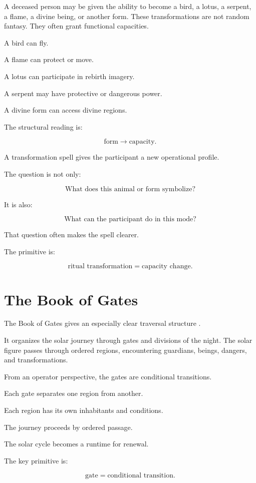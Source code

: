 \documentclass[11pt]{book}
\begin{document}
A deceased person may be given the ability to become a bird, a lotus, a serpent, a flame, a divine being, or another form. These transformations are not random fantasy. They often grant functional capacities.

A bird can fly.

A flame can protect or move.

A lotus can participate in rebirth imagery.

A serpent may have protective or dangerous power.

A divine form can access divine regions.

The structural reading is:

\[
\text{form} \rightarrow \text{capacity}.
\]

A transformation spell gives the participant a new operational profile.

The question is not only:

\[
\text{What does this animal or form symbolize?}
\]

It is also:

\[
\text{What can the participant do in this mode?}
\]

That question often makes the spell clearer.

The primitive is:

\[
\text{ritual transformation} = \text{capacity change}.
\]

\section{The Book of Gates}

The Book of Gates gives an especially clear traversal structure \cite{Hornung1990BookGates,Hornung1999BooksAfterlife}.

It organizes the solar journey through gates and divisions of the night. The solar figure passes through ordered regions, encountering guardians, beings, dangers, and transformations.

From an operator perspective, the gates are conditional transitions.

Each gate separates one region from another.

Each region has its own inhabitants and conditions.

The journey proceeds by ordered passage.

The solar cycle becomes a runtime for renewal.

The key primitive is:

\[
\text{gate} = \text{conditional transition}.
\]
\end{document}
